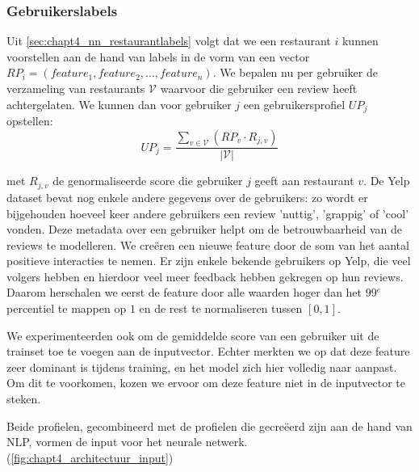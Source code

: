 \subsubsection{Gebruikerslabels}
Uit \autoref{sec:chapt4_nn_restaurantlabels} volgt dat we een restaurant $i$ kunnen voorstellen aan de hand van labels in de vorm van een vector $RP_i = (feature_1, feature_2, ..., feature_n)$. We bepalen nu per gebruiker de verzameling van restaurants $\mathcal{V}$ waarvoor die gebruiker een review heeft achtergelaten. We kunnen dan voor gebruiker $j$ een gebruikersprofiel $UP_j$ opstellen:
\begin{equation}
    UP_j = \frac{\sum_{v \in \mathcal{V}} (RP_v \cdot R_{j, v})}{\vert \mathcal{V} \vert}
\end{equation}

met $R_{j, v}$ de genormaliseerde score die gebruiker $j$ geeft aan restaurant $v$. De Yelp dataset bevat nog enkele andere gegevens over de gebruikers: zo wordt er bijgehouden hoeveel keer andere gebruikers een review 'nuttig', 'grappig' of 'cool' vonden. Deze metadata over een gebruiker helpt om de betrouwbaarheid van de reviews te modelleren. We creëren een nieuwe feature door de som van het aantal positieve interacties te nemen. Er zijn enkele bekende gebruikers op Yelp, die veel volgers hebben en hierdoor veel meer feedback hebben gekregen op hun reviews. Daarom herschalen we eerst de feature door alle waarden hoger dan het 99$^e$ percentiel te mappen op $1$ en de rest te normaliseren tussen $[0, 1]$.

We experimenteerden ook om de gemiddelde score van een gebruiker uit de trainset toe te voegen aan de inputvector. Echter merkten we op dat deze feature zeer dominant is tijdens training, en het model zich hier volledig naar aanpast. Om dit te voorkomen, kozen we ervoor om deze feature niet in de inputvector te steken.

Beide profielen, gecombineerd met de profielen die gecreëerd zijn aan de hand van NLP, vormen de input voor het neurale netwerk. (\autoref{fig:chapt4_architectuur_input})




